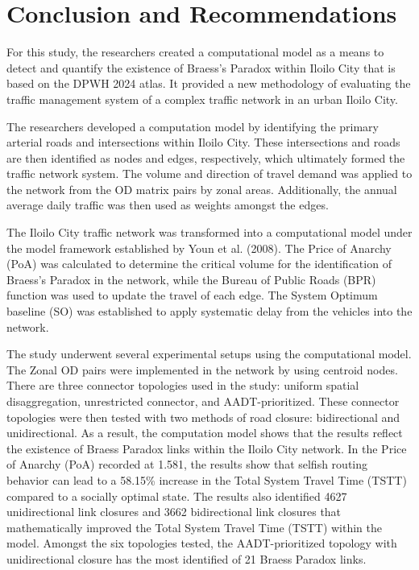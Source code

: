 \chapter{Conclusion and Recommendations}
\label{chap:conclusion}

For this study, the researchers created a computational model as a means to detect and quantify the existence of Braess's Paradox within Iloilo City that is based on the DPWH 2024 atlas. It provided a new methodology of evaluating the traffic management system of a complex traffic network in an urban Iloilo City.

The researchers developed a computation model by identifying the primary arterial roads and intersections within Iloilo City. These intersections and roads are then identified as nodes and edges, respectively, which ultimately formed the traffic network system. The volume and direction of travel demand was applied to the network from the OD matrix pairs by zonal areas. Additionally, the annual average daily traffic was then used as weights amongst the edges.

The Iloilo City traffic network was transformed into a computational model under the model framework established by Youn et al. (2008). The Price of Anarchy (PoA) was calculated to determine the critical volume for the identification of Braess's Paradox in the network, while the Bureau of Public Roads (BPR) function was used to update the travel of each edge. The System Optimum baseline (SO) was established to apply systematic delay from the vehicles into the network. 

The study underwent several experimental setups using the computational model. The Zonal OD pairs were implemented in the network by using centroid nodes. There are three connector topologies used in the study: uniform spatial disaggregation, unrestricted connector, and AADT-prioritized. These connector topologies were then tested with two methods of road closure: bidirectional and unidirectional.
As a result, the computation model shows that the results reflect the existence of Braess Paradox links within the Iloilo City network. In the Price of Anarchy (PoA) recorded at 1.581, the results show that selfish routing behavior can lead to a 58.15\% increase in the Total System Travel Time (TSTT) compared to a socially optimal state. The results also identified 4627 unidirectional link closures and 3662 bidirectional link closures that mathematically improved the Total System Travel Time (TSTT) within the model. Amongst the six topologies tested, the AADT-prioritized topology with unidirectional closure has the most identified of 21 Braess Paradox links.

